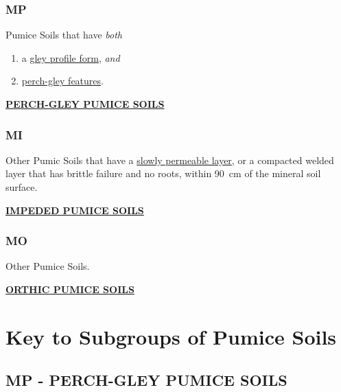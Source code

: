 \documentclass[
  letterpaper,
  DIV=11,
  numbers=noendperiod]{scrreprt}
\providecommand{\tightlist}{%
  \setlength{\itemsep}{0pt}\setlength{\parskip}{0pt}}\usepackage{longtable,booktabs,array}
\begin{document}
\hypertarget{sec-key-MP}{%
\subsubsection{\texorpdfstring{\textbf{MP}}{MP}}\label{sec-key-MP}}

Pumice Soils that have \emph{both}

\begin{enumerate}
\def\labelenumi{\arabic{enumi}.}
\tightlist
\item
  a \protect\hyperlink{sec-diag-gleypf}{gley profile form}, \emph{and}
\item
  \protect\hyperlink{sec-diag-pgley}{perch-gley features}.
\end{enumerate}

\protect\hyperlink{sec-MP}{\textbf{PERCH-GLEY PUMICE SOILS}}

\hypertarget{sec-key-MI}{%
\subsubsection{\texorpdfstring{\textbf{MI}}{MI}}\label{sec-key-MI}}

Other Pumic Soils that have a \protect\hyperlink{sec-diag-slowp}{slowly
permeable layer}, or a compacted welded layer that has brittle failure
and no roots, within 90~cm of the mineral soil surface.

\protect\hyperlink{sec-MI}{\textbf{IMPEDED PUMICE SOILS}}

\hypertarget{sec-key-MO}{%
\subsubsection{\texorpdfstring{\textbf{MO}}{MO}}\label{sec-key-MO}}

Other Pumice Soils.

\protect\hyperlink{sec-MO}{\textbf{ORTHIC PUMICE SOILS}}

\hypertarget{sec-sub-M}{%
\section{Key to Subgroups of Pumice Soils}\label{sec-sub-M}}

\hypertarget{sec-MP}{%
\subsection{\texorpdfstring{\textbf{MP} - PERCH-GLEY PUMICE
SOILS}{MP - PERCH-GLEY PUMICE SOILS}}\label{sec-MP}}
\end{document}
